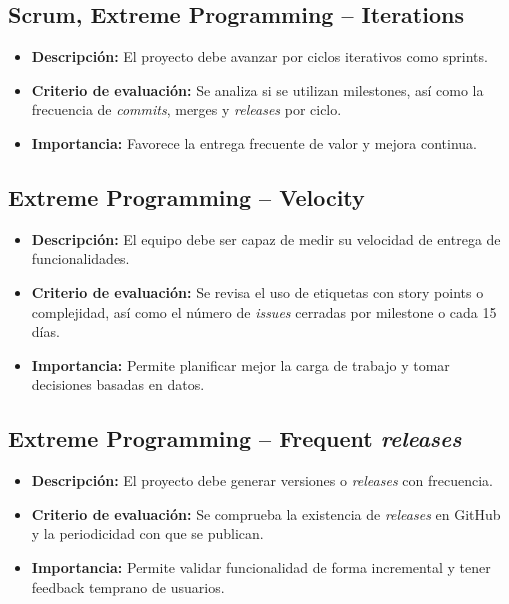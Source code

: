 \subsection{Scrum, Extreme Programming – Iterations}

\begin{itemize}
  \item \textbf{Descripción:} El proyecto debe avanzar por ciclos iterativos como sprints.
  \item \textbf{Criterio de evaluación:} Se analiza si se utilizan milestones, así como la frecuencia de \textit{commits}, merges y \textit{releases} por ciclo.
  \item \textbf{Importancia:} Favorece la entrega frecuente de valor y mejora continua.
\end{itemize}

\subsection{Extreme Programming – Velocity}

\begin{itemize}
  \item \textbf{Descripción:} El equipo debe ser capaz de medir su velocidad de entrega de funcionalidades.
  \item \textbf{Criterio de evaluación:} Se revisa el uso de etiquetas con story points o complejidad, así como el número de \textit{issues} cerradas por milestone o cada 15 días.
  \item \textbf{Importancia:} Permite planificar mejor la carga de trabajo y tomar decisiones basadas en datos.
\end{itemize}

\subsection{Extreme Programming – Frequent \textit{releases}}

\begin{itemize}
  \item \textbf{Descripción:} El proyecto debe generar versiones o \textit{releases} con frecuencia.
  \item \textbf{Criterio de evaluación:} Se comprueba la existencia de \textit{releases} en GitHub y la periodicidad con que se publican.
  \item \textbf{Importancia:} Permite validar funcionalidad de forma incremental y tener feedback temprano de usuarios.
\end{itemize}

